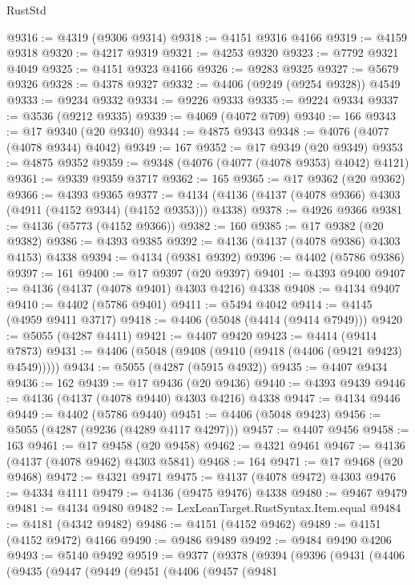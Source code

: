 \begin{lexlean}{RustStd}
\begin{coremodule}
{\begin{coremodule}
{{{{{{{{{{{{{{{{{{{{{{{{{{{{{{{{{{{{{{{{{{{{{{{{{{@9316 := @4319 (@9306 @9314)
@9318 := @4151 @9316 @4166
@9319 := @4159 @9318
@9320 := @4217 @9319
@9321 := @4253 @9320
@9323 := @7792 @9321 @4049
@9325 := @4151 @9323 @4166
@9326 := @9283 @9325
@9327 := @5679 @9326
@9328 := @4378 @9327
@9332 := @4406 (@9249 (@9254 @9328)) @4549
@9333 := @9234 @9332
@9334 := @9226 @9333
@9335 := @9224 @9334
@9337 := @3536 (@9212 @9335)
@9339 := @4069 (@4072 @709)
@9340 := 166
@9343 := @17 @9340 (@20 @9340)
@9344 := @4875 @9343
@9348 := @4076 (@4077 (@4078 @9344) @4042)
@9349 := 167
@9352 := @17 @9349 (@20 @9349)
@9353 := @4875 @9352
@9359 := @9348 (@4076 (@4077 (@4078 @9353) @4042) @4121)
@9361 := @9339 @9359 @3717
@9362 := 165
@9365 := @17 @9362 (@20 @9362)
@9366 := @4393 @9365
@9377 := @4134 (@4136 (@4137 (@4078 @9366) @4303 (@4911 (@4152 @9344) (@4152 @9353))) @4338)
@9378 := @4926 @9366
@9381 := @4136 (@5773 (@4152 @9366))
@9382 := 160
@9385 := @17 @9382 (@20 @9382)
@9386 := @4393 @9385
@9392 := @4136 (@4137 (@4078 @9386) @4303 @4153) @4338
@9394 := @4134 (@9381 @9392)
@9396 := @4402 (@5786 @9386)
@9397 := 161
@9400 := @17 @9397 (@20 @9397)
@9401 := @4393 @9400
@9407 := @4136 (@4137 (@4078 @9401) @4303 @4216) @4338
@9408 := @4134 @9407
@9410 := @4402 (@5786 @9401)
@9411 := @5494 @4042
@9414 := @4145 (@4959 @9411 @3717)
@9418 := @4406 (@5048 (@4414 (@9414 @7949)))
@9420 := @5055 (@4287 @4411)
@9421 := @4407 @9420
@9423 := @4414 (@9414 @7873)
@9431 := @4406 (@5048 (@9408 (@9410 (@9418 (@4406 (@9421 @9423) @4549)))))
@9434 := @5055 (@4287 (@5915 @4932))
@9435 := @4407 @9434
@9436 := 162
@9439 := @17 @9436 (@20 @9436)
@9440 := @4393 @9439
@9446 := @4136 (@4137 (@4078 @9440) @4303 @4216) @4338
@9447 := @4134 @9446
@9449 := @4402 (@5786 @9440)
@9451 := @4406 (@5048 @9423)
@9456 := @5055 (@4287 (@9236 (@4289 @4117 @4297)))
@9457 := @4407 @9456
@9458 := 163
@9461 := @17 @9458 (@20 @9458)
@9462 := @4321 @9461
@9467 := @4136 (@4137 (@4078 @9462) @4303 @5841)
@9468 := 164
@9471 := @17 @9468 (@20 @9468)
@9472 := @4321 @9471
@9475 := @4137 (@4078 @9472) @4303
@9476 := @4334 @4111
@9479 := @4136 (@9475 @9476) @4338
@9480 := @9467 @9479
@9481 := @4134 @9480
@9482 := LexLeanTarget.RustSyntax.Item.equal
@9484 := @4181 (@4342 @9482)
@9486 := @4151 (@4152 @9462)
@9489 := @4151 (@4152 @9472) @4166
@9490 := @9486 @9489
@9492 := @9484 @9490 @4206
@9493 := @5140 @9492
@9519 := @9377
    (@9378
      (@9394
        (@9396
          (@9431
            (@4406
              (@9435
                (@9447
                  (@9449
                    (@9451
                      (@4406
                        (@9457
                          (@9481
}}}}}}}}}}}}}}}}}}}}}}}}}}}}}}}}}}}}}}}}}}}}}}}}}}
\end{coremodule}}
\end{coremodule}
\end{lexlean}
